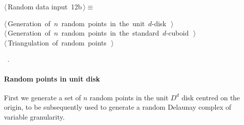 \documentclass[11pt,oneside]{article}	%
\begin{document}
\begin{flushleft} \small \label{scrap18}
\protect{}$\langle\,$Random data input\nobreak\ {\footnotesize 12b}$\,\rangle\equiv$
\vspace{-1ex}
\begin{list}{}{} \item
\mbox{}\verb@@\hbox{$\langle\,$Generation of $n$ random points in the unit $d$-disk\nobreak\ {\footnotesize {}}$\,\rangle$}\verb@@\\
\mbox{}\verb@@\hbox{$\langle\,$Generation of $n$ random points in the standard $d$-cuboid\nobreak\ {\footnotesize {}}$\,\rangle$}\verb@@\\
\mbox{}\verb@@\hbox{$\langle\,$Triangulation of random points\nobreak\ {\footnotesize {}}$\,\rangle$}\verb@@\\
\mbox{}\verb@@{\NWsep}
\end{list}
\vspace{-1ex}
\footnotesize\addtolength{\baselineskip}{-1ex}
\begin{list}{}{\setlength{\itemsep}{-\parsep}\setlength{\itemindent}{-\leftmargin}}
\item \NWtxtMacroRefIn\ .
\end{list}
\end{flushleft}

\paragraph{Random points in unit disk} 
First we generate a  set of $n$ random points in the unit $D^d$ disk centred on the origin, to be subsequently used to generate a random Delaunay complex of variable granularity.
\end{document}
